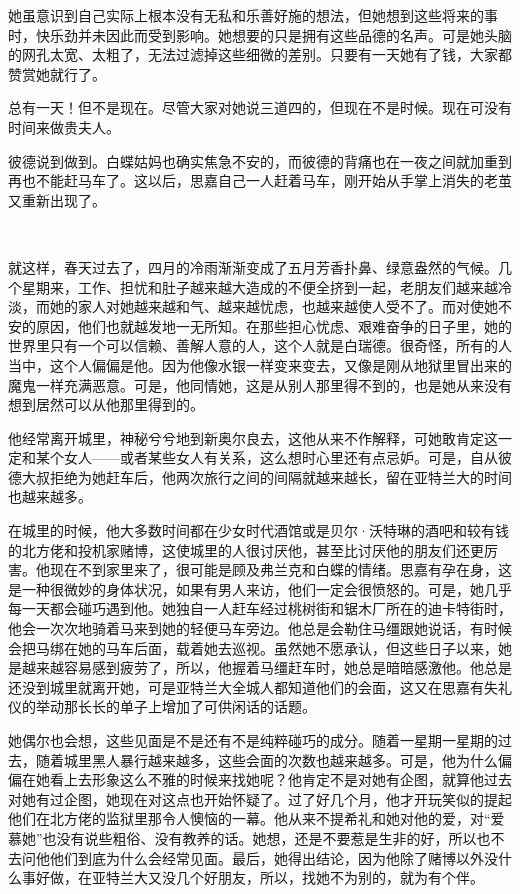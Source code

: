 \par 她虽意识到自己实际上根本没有无私和乐善好施的想法，但她想到这些将来的事时，快乐劲并未因此而受到影响。她想要的只是拥有这些品德的名声。可是她头脑的网孔太宽、太粗了，无法过滤掉这些细微的差别。只要有一天她有了钱，大家都赞赏她就行了。
\par 总有一天！但不是现在。尽管大家对她说三道四的，但现在不是时候。现在可没有时间来做贵夫人。
\par 彼德说到做到。白蝶姑妈也确实焦急不安的，而彼德的背痛也在一夜之间就加重到再也不能赶马车了。这以后，思嘉自己一人赶着马车，刚开始从手掌上消失的老茧又重新出现了。
\par  
\par 就这样，春天过去了，四月的冷雨渐渐变成了五月芳香扑鼻、绿意盎然的气候。几个星期来，工作、担忧和肚子越来越大造成的不便全挤到一起，老朋友们越来越冷淡，而她的家人对她越来越和气、越来越忧虑，也越来越使人受不了。而对使她不安的原因，他们也就越发地一无所知。在那些担心忧虑、艰难奋争的日子里，她的世界里只有一个可以信赖、善解人意的人，这个人就是白瑞德。很奇怪，所有的人当中，这个人偏偏是他。因为他像水银一样变来变去，又像是刚从地狱里冒出来的魔鬼一样充满恶意。可是，他同情她，这是从别人那里得不到的，也是她从来没有想到居然可以从他那里得到的。
\par 他经常离开城里，神秘兮兮地到新奥尔良去，这他从来不作解释，可她敢肯定这一定和某个女人——或者某些女人有关系，这么想时心里还有点忌妒。可是，自从彼德大叔拒绝为她赶车后，他两次旅行之间的间隔就越来越长，留在亚特兰大的时间也越来越多。
\par 在城里的时候，他大多数时间都在少女时代酒馆或是贝尔·沃特琳的酒吧和较有钱的北方佬和投机家赌博，这使城里的人很讨厌他，甚至比讨厌他的朋友们还更厉害。他现在不到家里来了，很可能是顾及弗兰克和白蝶的情绪。思嘉有孕在身，这是一种很微妙的身体状况，如果有男人来访，他们一定会很愤怒的。可是，她几乎每一天都会碰巧遇到他。她独自一人赶车经过桃树街和锯木厂所在的迪卡特街时，他会一次次地骑着马来到她的轻便马车旁边。他总是会勒住马缰跟她说话，有时候会把马绑在她的马车后面，载着她去巡视。虽然她不愿承认，但这些日子以来，她是越来越容易感到疲劳了，所以，他握着马缰赶车时，她总是暗暗感激他。他总是还没到城里就离开她，可是亚特兰大全城人都知道他们的会面，这又在思嘉有失礼仪的举动那长长的单子上增加了可供闲话的话题。
\par 她偶尔也会想，这些见面是不是还有不是纯粹碰巧的成分。随着一星期一星期的过去，随着城里黑人暴行越来越多，这些会面的次数也越来越多。可是，他为什么偏偏在她看上去形象这么不雅的时候来找她呢？他肯定不是对她有企图，就算他过去对她有过企图，她现在对这点也开始怀疑了。过了好几个月，他才开玩笑似的提起他们在北方佬的监狱里那令人懊恼的一幕。他从来不提希礼和她对他的爱，对“爱慕她”也没有说些粗俗、没有教养的话。她想，还是不要惹是生非的好，所以也不去问他他们到底为什么会经常见面。最后，她得出结论，因为他除了赌博以外没什么事好做，在亚特兰大又没几个好朋友，所以，找她不为别的，就为有个伴。
